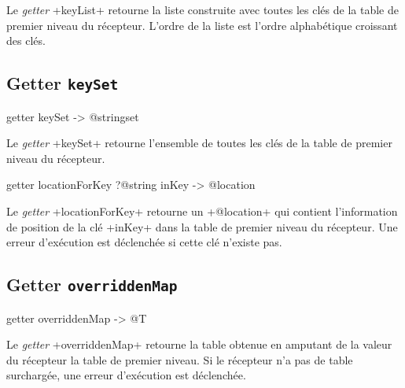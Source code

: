 Le \emph{getter} \ggst+keyList+ retourne la liste construite avec toutes les clés de la table de premier niveau du récepteur. L'ordre de la liste est l'ordre alphabétique croissant des clés.



\subsection{Getter \texttt{keySet}}

\begin{galgas3}
getter keySet -> @stringset
\end{galgas3}


Le \emph{getter} \ggst+keySet+ retourne l'ensemble de toutes les clés de la table de premier niveau du récepteur.






\begin{galgas3}
getter locationForKey ?@string inKey -> @location
\end{galgas3}


Le \emph{getter} \ggst+locationForKey+ retourne un \ggst+@location+ qui contient l'information de position de la clé \ggst+inKey+ dans la table de premier niveau du récepteur. Une erreur d'exécution est déclenchée si cette clé n'existe pas.








\subsection{Getter \texttt{overriddenMap}}

\begin{galgas3}
getter overriddenMap -> @T
\end{galgas3}


Le \emph{getter} \ggst+overriddenMap+ retourne la table obtenue en amputant de la valeur du récepteur la table de premier niveau. Si le récepteur n'a pas de table surchargée, une erreur d'exécution est déclenchée.









